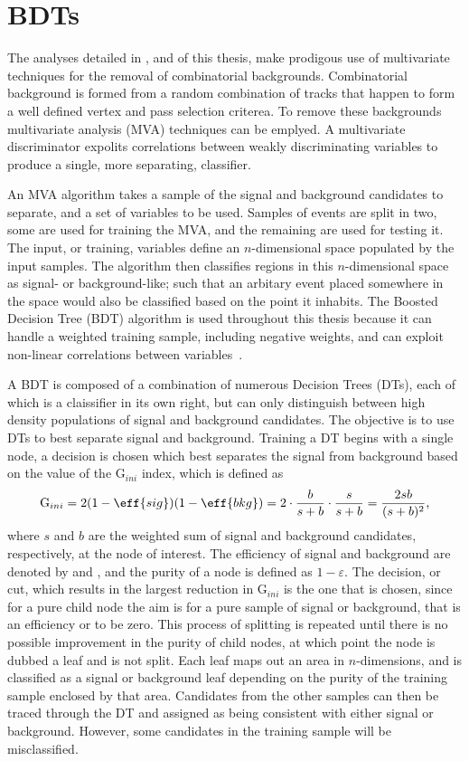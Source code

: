 \chapter{BDTs}

The analyses detailed in ,  and  of this thesis, make
prodigous use of multivariate techniques for the removal of combinatorial backgrounds.
Combinatorial background is formed from a random combination of tracks that happen to form a well
defined vertex and pass selection criterea.
To remove these backgrounds multivariate analysis (MVA) techniques can be emplyed.
A multivariate discriminator expolits correlations between weakly discriminating variables to
produce a single, more separating, classifier.

An MVA algorithm takes a sample of the signal and background candidates to separate, and a set of
variables to be used.
Samples of events are split in two, some are used for training the MVA, and the remaining are used
for testing it.
The input, or training, variables define an $n$-dimensional space populated by the input samples.
The algorithm then classifies regions in this $n$-dimensional space as signal- or background-like;
such that an arbitary event placed somewhere in the space would also be classified based on the
point it inhabits.
The Boosted Decision Tree (BDT) algorithm is used throughout this thesis because it can handle
a weighted training sample, including negative weights, and can exploit non-linear correlations
between variables~\cite{Breiman,Roe}.

A BDT is composed of a combination of numerous Decision Trees (DTs), each of which is a claissifier
in its own right, but can only distinguish between high density populations of signal and
background candidates.
The objective is to use DTs to best separate signal and background.
Training a DT begins with a single node, a decision is chosen which best separates the signal from
background based on the value of the $\mathrm{G}_{ini}$ index, which is defined as
\begin{equation}
  \mathrm{G}_{ini} = 2(1-\eff{sig})(1-\eff{bkg}) = 2\cdot\frac{b}{s+b}\cdot\frac{s}{s+b}
  = \frac{2sb}{(s+b)^2},
\end{equation}
where $s$ and $b$ are the weighted sum of signal and background candidates, respectively, at the
node of interest.
The efficiency of signal and background are denoted by  and , and the purity of a
node is defined as $1-\varepsilon$.
The decision, or cut, which results in the largest reduction in $\mathrm{G}_{ini}$ is the one that
is chosen, since for a pure child node the aim is for a pure sample of signal or background, that
is an efficiency  or  to be zero.
This process of splitting is repeated until there is no possible improvement in the purity of child
nodes, at which point the node is dubbed a leaf and is not split.
Each leaf maps out an area in $n$-dimensions, and is classified as a signal or background leaf
depending on the purity of the training sample enclosed by that area.
Candidates from the other samples can then be traced through the DT and assigned as being
consistent with either signal or background.
However, some candidates in the training sample will be misclassified.


